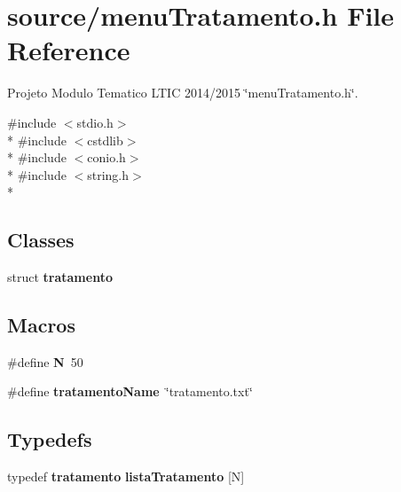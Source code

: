 \section{source/menu\+Tratamento.h File Reference}
\label{menu_tratamento_8h}


Projeto Modulo Tematico L\+T\+I\+C 2014/2015 \char`\"{}menu\+Tratamento.\+h\char`\"{}.  


{\ttfamily \#include $<$stdio.\+h$>$}\\*
{\ttfamily \#include $<$cstdlib$>$}\\*
{\ttfamily \#include $<$conio.\+h$>$}\\*
{\ttfamily \#include $<$string.\+h$>$}\\*
\subsection*{Classes}
\begin{DoxyCompactItemize}
\item 
struct {\bf tratamento}
\end{DoxyCompactItemize}
\subsection*{Macros}
\begin{DoxyCompactItemize}
\item 
\#define {\bfseries N}~50\label{menu_tratamento_8h_a0240ac851181b84ac374872dc5434ee4}

\item 
\#define {\bfseries tratamento\+Name}~\char`\"{}tratamento.\+txt\char`\"{}\label{menu_tratamento_8h_a2dcb977be407cc7aeb05e72ae6728504}

\end{DoxyCompactItemize}
\subsection*{Typedefs}
\begin{DoxyCompactItemize}
\item 
typedef {\bf tratamento} {\bf lista\+Tratamento} [N]
\end{DoxyCompactItemize}

